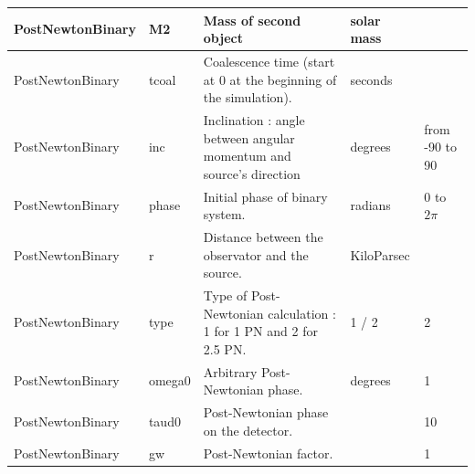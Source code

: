 \documentclass[a4paper,english,12pt]{article}
\begin{document}
\begin{table}[p]
\begin{center}
\begin{tabular}{|p{}|p{}|p{65mm}|p{}|p{}|}
\hline
PostNewtonBinary & M2 &  Mass of second object & solar mass &  \\
\hline
PostNewtonBinary & tcoal & Coalescence time (start at 0 at the beginning of the simulation). & seconds &  \\
\hline
PostNewtonBinary & inc & Inclination : angle between angular momentum and source's direction & degrees & from -90 to 90 \\
\hline
PostNewtonBinary & phase & Initial phase of binary system. & radians & 0 to $2 \pi$  \\
\hline
PostNewtonBinary & r & Distance between the observator and the source. & KiloParsec &  \\
\hline
\hline
PostNewtonBinary & type & Type of Post-Newtonian calculation : 1 for 1 PN and 2 for 2.5 PN. & 1 / 2 & 2 \\
\hline
PostNewtonBinary & omega0 & Arbitrary Post-Newtonian phase. & degrees & 1 \\
\hline
PostNewtonBinary & taud0 & Post-Newtonian phase on the detector. &  & 10  \\
\hline
PostNewtonBinary & gw & Post-Newtonian factor. &  & 1 \\
\hline
\end{tabular} 
\end{center} 
\label{table_paramGW} 
\end{table}
\end{document}
